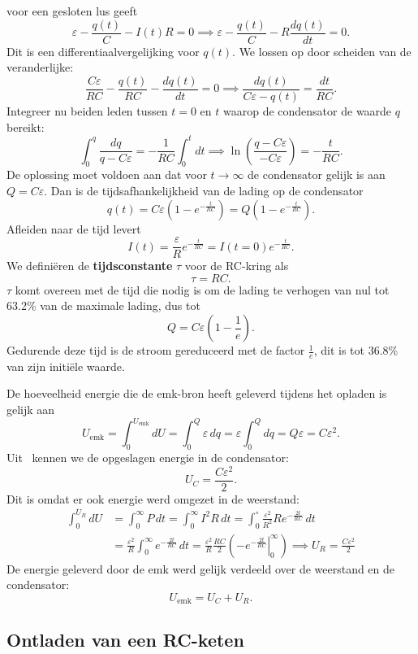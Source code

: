  voor een gesloten lus geeft
\[
    \varepsilon - \frac{q(t)}{C} - I(t)R = 0 \implies \varepsilon - \frac{q(t)}{C} - R \frac{dq(t)}{dt} = 0.
\]
Dit is een differentiaalvergelijking voor $q(t)$.
We lossen op door scheiden van de veranderlijke:
\[
    \frac{C\varepsilon}{RC} - \frac{q(t)}{RC} - \frac{dq(t)}{dt} = 0 \implies \frac{dq(t)}{C\varepsilon -q(t)} = \frac{dt}{RC}.
\]
Integreer nu beiden leden tussen $t=0$ en $t$ waarop de condensator de waarde $q$ bereikt:
\[
    \int_0^q \frac{dq}{q-C\varepsilon} = -\frac{1}{RC}\int_0^t dt \implies \ln\left(\frac{q-C\varepsilon}{-C\varepsilon}\right) = -\frac{t}{RC}.
\]
De oplossing moet voldoen aan dat voor $t \to \infty$ de condensator gelijk is aan $Q = C\varepsilon$.
Dan is de tijdsafhankelijkheid van de lading op de condensator
\[
    q(t) = C\varepsilon\left(1-e^{-\frac{t}{RC}}\right) = Q\left(1-e^{-\frac{t}{RC}}\right).
\]
Afleiden naar de tijd levert
\[
    I(t) = \frac{\varepsilon}{R}e^{-\frac{t}{RC}} = I(t=0)e^{-\frac{t}{RC}}.
\]
We definiëren de \textbf{tijdsconstante} $\tau$ voor de RC-kring als
\[
    \tau = RC.
\]
$\tau$ komt overeen met de tijd die nodig is om de lading te verhogen van nul tot 63.2\% van de maximale lading, dus tot
\[
    Q = C\varepsilon(1-\frac{1}{e}).
\]
Gedurende deze tijd is de stroom gereduceerd met de factor $\frac{1}{e}$, dit is tot 36.8\% van zijn initiële waarde.

De hoeveelheid energie die de emk-bron heeft geleverd tijdens het opladen is gelijk aan
\[
    U_{\text{emk}} = \int_0^{U_{\text{emk}}} dU = \int_0^Q \varepsilon\,dq = \varepsilon\int_0^Q dq = Q\varepsilon = C\varepsilon^2.
\]
Uit~\cite[H24]{giancoli} kennen we de opgeslagen energie in de condensator:
\[
    U_C = \frac{C\varepsilon^2}{2}.
\]
Dit is omdat er ook energie werd omgezet in de weerstand:
\begin{align*}
    \int_0^{U_R}dU &= \int_0^\infty P\,dt = \int_0^\infty I^2R\,dt = \int_0^\circ \frac{\varepsilon^2}{R^2}Re^{-\frac{2t}{RC}}\,dt \\
                   &= \frac{\varepsilon^2}{R}\int_0^\infty e^{-\frac{2t}{RC}}\,dt = \frac{\varepsilon^2}{R}\frac{RC}{2}\left(\left.-e^{-\frac{2t}{RC}}\right\vert_0^\infty\right) \implies U_R = \frac{C\varepsilon^2}{2}
\end{align*}
De energie geleverd door de emk werd gelijk verdeeld over de weerstand en de condensator:
\[
    U_{\text{emk}} = U_C + U_R.
\]


\subsection{Ontladen van een RC-keten}


